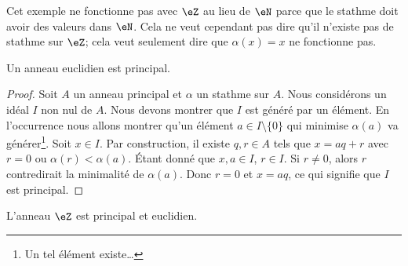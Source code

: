 Cet exemple ne fonctionne pas avec \( \eZ\) au lieu de \( \eN\) parce que le stathme doit avoir des valeurs dans \( \eN\). Cela ne veut cependant pas dire qu'il n'existe pas de stathme sur \( \eZ\); cela veut seulement dire que \( \alpha(x)=x\) ne fonctionne pas.

\begin{proposition}\label{Propkllxnv}
    Un anneau euclidien est principal.
\end{proposition}

\begin{proof}
    Soit \( A\) un anneau principal et \( \alpha\) un stathme sur \( A\). Nous considérons un idéal \( I\) non nul de \( A\). Nous devons montrer que \( I\) est généré par un élément. En l'occurrence nous allons montrer qu'un élément \( a\in I\setminus\{ 0 \}\) qui minimise \( \alpha(a)\) va générer\footnote{Un tel élément existe\dots}. Soit \( x\in I\). Par construction, il existe \( q,r\in A\) tels que \( x=aq+r\) avec \( r=0\) ou \( \alpha(r)<\alpha(a)\). Étant donné que \( x,a\in I\), \( r\in I\). Si \( r\neq 0\), alors \( r\) contredirait la minimalité de \( \alpha(a)\). Donc \( r=0\) et \( x=aq\), ce qui signifie que \( I\) est principal.
\end{proof}

\begin{proposition}     \label{PROPooPJGLooQSrJTU}
    L'anneau \( \eZ\) est principal et euclidien.
\end{proposition}

